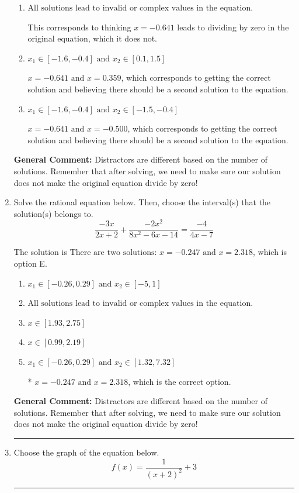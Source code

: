 \documentclass{extbook}[14pt]
\newcommand{\litem}[1]{\item #1

\rule{\textwidth}{0.4pt}}
\begin{document}
\begin{enumerate}
{\begin{enumerate}[label=\Alph*.]
$x = 0.359$, which corresponds to not distributing the factor $4x + 2$ correctly when trying to eliminate the fraction.
\item \( \text{All solutions lead to invalid or complex values in the equation.} \)

This corresponds to thinking $x = -0.641$ leads to dividing by zero in the original equation, which it does not.
\item \( x_1 \in [-1.6, -0.4] \text{ and } x_2 \in [0.1,1.5] \)

$x = -0.641 \text{ and } x = 0.359$, which corresponds to getting the correct solution and believing there should be a second solution to the equation.
\item \( x_1 \in [-1.6, -0.4] \text{ and } x_2 \in [-1.5,-0.4] \)

$x = -0.641 \text{ and } x = -0.500$, which corresponds to getting the correct solution and believing there should be a second solution to the equation.
\end{enumerate}

\textbf{General Comment:} Distractors are different based on the number of solutions. Remember that after solving, we need to make sure our solution does not make the original equation divide by zero!
}
\litem{
Solve the rational equation below. Then, choose the interval(s) that the solution(s) belongs to.
\[ \frac{-3x}{2x + 2} + \frac{-2x^{2}}{8x^{2} -6 x -14} = \frac{-4}{4x -7} \]

The solution is \( \text{There are two solutions: } x = -0.247 \text{ and } x = 2.318 \), which is option E.\begin{enumerate}[label=\Alph*.]
\item \( x_1 \in [-0.26, 0.29] \text{ and } x_2 \in [-5,1] \)


\item \( \text{All solutions lead to invalid or complex values in the equation.} \)


\item \( x \in [1.93,2.75] \)


\item \( x \in [0.99,2.19] \)


\item \( x_1 \in [-0.26, 0.29] \text{ and } x_2 \in [1.32,7.32] \)

* $x = -0.247 \text{ and } x = 2.318$, which is the correct option.
\end{enumerate}

\textbf{General Comment:} Distractors are different based on the number of solutions. Remember that after solving, we need to make sure our solution does not make the original equation divide by zero!
}
\litem{
Choose the graph of the equation below.
\[ f(x) = \frac{1}{(x + 2)^2} + 3 \]

}
\end{enumerate}
\end{document}
